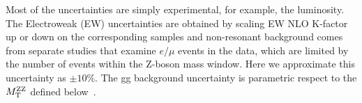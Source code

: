 Most of the uncertainties are simply experimental, for example, the luminosity. The Electroweak (EW)
uncertainties are obtained by scaling EW NLO K-factor up or down on the corresponding samples and non-resonant
background comes from separate studies that examine $e/\mu$ events in the data, which
are limited by the number of events within the Z-boson mass window. Here we approximate this 
uncertainty as $\pm 10\%$.  The gg background uncertainty is parametric respect to the $M_\mathrm{T}^{\mathrm{ZZ}}$ defined 
below~\cite{campbell_two_2016, caola_qcd_2015, caola_qcd_2015}.


